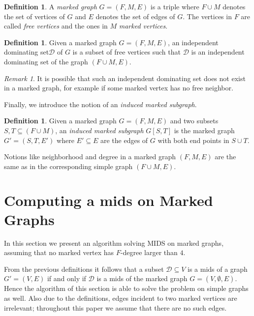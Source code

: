 \documentclass[a4paper,10pt]{article}
\theoremstyle{plain}
\theoremstyle{definition}
\newtheorem{definition}[theorem]{Definition}
\theoremstyle{remark}
\newtheorem*{remark}{Remark}
\newcommand{\ids}{independent dominating set\xspace}
\newcommand{\MIDSpb}{\textsc{MIDS}\xspace}
\newcommand{\mids}{mids\xspace}
\begin{document}
\begin{definition}
A \emph{marked graph} $G=(F,M,E)$ is a triple where 
$F\cup M$ denotes the set of vertices of $G$ and
$E$ denotes the set of edges of $G$.
The vertices in $F$ are called \emph{free vertices} and the ones in $M$
\emph{marked vertices}.
\end{definition}

\begin{definition}
\label{defidsmarked}
Given a marked graph $G=(F,M,E)$, an \ids $\mathcal{D}$
of $G$ is a subset of free vertices such that
$\mathcal{D}$ is an \ids of the graph $(F\cup M, E)$.
\end{definition}

\begin{remark}
It is possible that such an \ids does not exist in a marked graph,
for example if some marked vertex has no free neighbor.
\end{remark}

\noindent Finally, we introduce the notion of an \emph{induced marked subgraph}.

\begin{definition}
Given a marked graph $G=(F,M,E)$ and two subsets $S,T \subseteq (F\cup M)$, an
\emph{induced marked subgraph} $G[S,T]$ is the marked graph
$G'=(S, T, E')$
where $E' \subseteq E$ are the edges of $G$ with
both end points in $S \cup T$.
\end{definition}

\noindent Notions like neighborhood and degree in a marked graph $(F,M,E)$ are
the same as in the corresponding simple graph $(F \cup M,E)$.



\section{Computing a \mids on Marked Graphs}


In this section we present an algorithm
solving \MIDSpb on marked graphs, assuming that no marked vertex has $F$-degree larger than $4$.

{F}rom the previous definitions it follows that
a subset $\mathcal{D}\subseteq V$ is a \mids of a graph $G'=(V,E)$
if and only if $\mathcal{D}$ is a \mids of the
marked graph $G=(V,\emptyset,E)$. Hence the algorithm
of this section is able to solve the problem on simple graphs as well.
Also due to the definitions, edges incident to two marked vertices
are irrelevant; throughout this paper we assume that there are no such edges.
\end{document}
